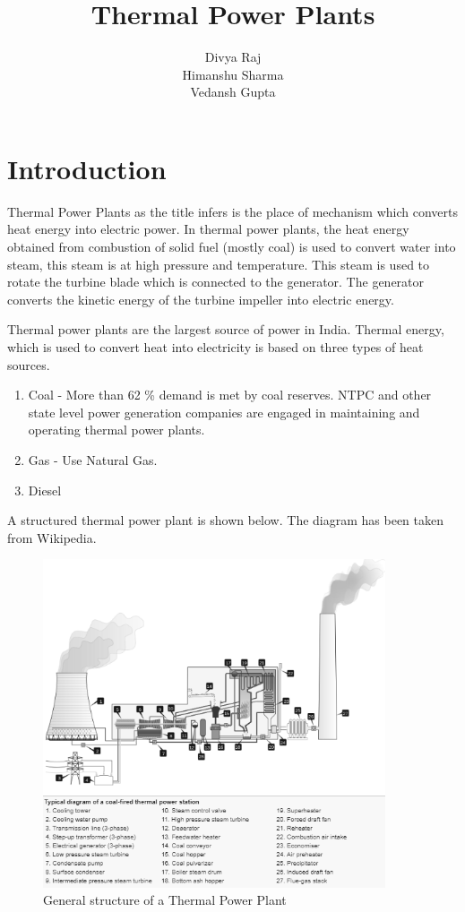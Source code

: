\documentclass{report}
\title{\textbf{\Huge Thermal Power Plants}}
\author{Divya Raj \circ 1610110123 \\ Himanshu Sharma \circ 1610110149 \\ Vedansh Gupta \circ 1610110429}
\date{}
\begin{document}
\maketitle
\tableofcontents
\newpage
\renewcommand{\thesection}{\arabic{section}}
\section{Introduction}
Thermal Power Plants as the title infers is the place of mechanism which converts heat energy into electric power. In thermal power plants, the heat energy obtained from combustion of solid fuel (mostly coal) is used to convert water into steam, this steam is at high pressure and temperature. This steam is used to rotate the turbine blade which is connected to the generator. The generator converts the kinetic energy of the turbine impeller into electric energy.
\par Thermal power plants are the largest source of power in India. Thermal energy, which is used to convert heat into electricity is based on three types of heat sources.
\begin{enumerate}
\item{Coal - More than 62 \% demand is met by coal reserves. NTPC and other state level power generation companies are engaged in maintaining and operating thermal power plants.}
\item{Gas - Use Natural Gas.}
\item{Diesel}
\end{enumerate}
A structured thermal power plant is shown below. The diagram has been taken from Wikipedia.

\begin{figure}[H]
\centering \includegraphics[width=0.9\textwidth]{images/tpp1.png}
\caption{General structure of a Thermal Power Plant}
\end{figure}
\end{document}
